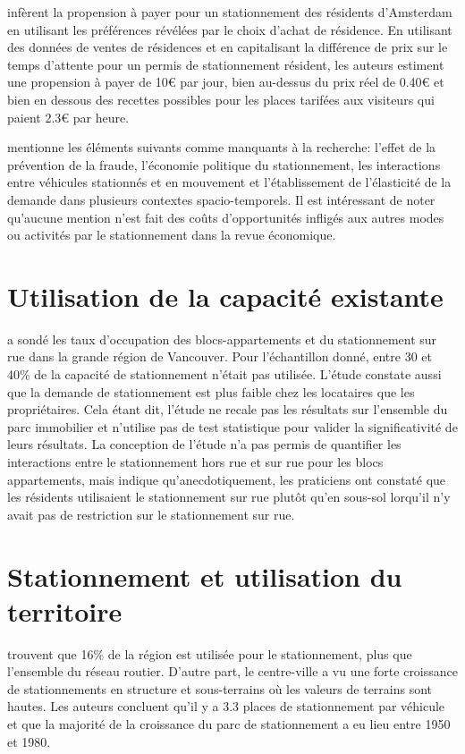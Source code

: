 \textcite{vanOmmeren:RealPrice:2011} infèrent la propension à payer pour un stationnement des résidents d'Amsterdam en utilisant les préférences révélées par le choix d'achat de résidence. En utilisant des données de ventes de résidences et en capitalisant la différence de prix sur le temps d'attente pour un permis de stationnement résident, les auteurs estiment une propension à payer de 10€ par jour, bien au-dessus du prix réel de 0.40€ et bien en dessous des recettes possibles pour les places tarifées aux visiteurs qui paient 2.3€ par heure.

\textcite{Inci:ReviewEconomics:2015} mentionne les éléments suivants comme manquants à la recherche: l'effet de la prévention de la fraude, l'économie politique du stationnement, les interactions entre véhicules stationnés et en mouvement et l'établissement de l'élasticité de la demande dans plusieurs contextes spacio-temporels. Il est intéressant de noter qu'aucune mention n'est fait des coûts d'opportunités infligés aux autres modes ou activités par le stationnement dans la revue économique.

\section{Utilisation de la capacité existante}
\textcite{Translink:2018Regional:2019} a sondé les taux d'occupation des blocs-appartements et du stationnement sur rue dans la grande région de Vancouver. Pour l'échantillon donné, entre 30 et 40\% de la capacité de stationnement n'était pas utilisée. L'étude constate aussi que la demande de stationnement est plus faible chez les locataires que les propriétaires. Cela étant dit, l'étude ne recale pas les résultats sur l'ensemble du parc immobilier et n'utilise pas de test statistique pour valider la significativité de leurs résultats. La conception de l'étude n'a pas permis de quantifier les interactions entre le stationnement hors rue et sur rue pour les blocs appartements, mais indique qu'anecdotiquement, les praticiens ont constaté que les résidents utilisaient le stationnement sur rue plutôt qu'en sous-sol lorqu'il n'y avait pas de restriction sur le stationnement sur rue. 

\section{Stationnement et utilisation du territoire}
\textcite{Chester:ParkingInfrastructure:2015} trouvent que 16\% de la région est utilisée pour le stationnement, plus que l'ensemble du réseau routier. D'autre part, le centre-ville a vu une forte croissance de stationnements en structure et sous-terrains où les valeurs de terrains sont hautes. Les auteurs concluent qu'il y a 3.3 places de stationnement par véhicule et que la majorité de la croissance du parc de stationnement a eu lieu entre 1950 et 1980.\par

